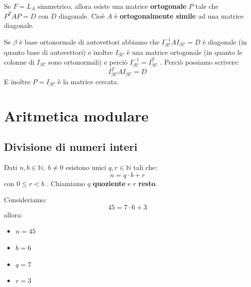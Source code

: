 \documentclass[
  a4paper,
]{article}
\providecommand{\tightlist}{%
  \setlength{\itemsep}{0pt}\setlength{\parskip}{0pt}}
\providecommand{\tightlist}{}
\begin{document}
\begin{propositionbox}[Corollario]
Se \(F = L_A\) simmetrico, allora esiste una matrice \textbf{ortogonale}
\(P\) tale che \(P^TAP =D\) con \(D\) diagonale. Cioè \(A\) è
\textbf{ortogonalmente simile} ad una matrice diagonale.
\end{propositionbox}

\begin{proofbox}
Se \(\beta\) è base ortonormale di autovettori abbiamo che
\(I^{-1}_{\beta \mathcal{C}}A I_{\beta \mathcal{C}} = D\) è diagonale
(in quanto base di autovettori) e inoltre \(I_{\beta \mathcal{C}}\) è
una matrice ortogonale (in quanto le colonne di
\(I_{\beta \mathcal{C}}\) sono ortonormali) e perciò
\(I_{\beta \mathcal{C}} ^{-1} = I_{\beta \mathcal{C}} ^T\) . Perciò
possiamo scrivere: \[
I^{T}_{\beta \mathcal{C}}A I_{\beta \mathcal{C}} = D
\] E inoltre \(P = I_{\beta \mathcal{C}}\) è la matrice cercata.
\end{proofbox}

\newpage

\hypertarget{aritmetica-modulare}{%
\section{Aritmetica modulare}\label{aritmetica-modulare}}

\hypertarget{divisione-di-numeri-interi}{%
\subsection{Divisione di numeri
interi}\label{divisione-di-numeri-interi}}

\begin{teoremabox}
Dati \(n, b \in \mathbb{N}, \; b \neq 0\) esistono unici
\(q, r \in \mathbb{N}\) tali che: \[
n = q\cdot b + r
\] con \(0 \leq r < b\) . Chiamiamo \(q\) \textbf{quoziente} e \(r\)
\textbf{resto}.
\end{teoremabox}

\begin{examplebox}
Consideriamo: \[
45 = 7 \cdot 6 + 3
\] allora:

\begin{itemize}
\tightlist
\item
  \(n = 45\)
\item
  \(b = 6\)
\item
  \(q = 7\)
\item
  \(r = 3\)
\end{itemize}
\end{examplebox}
\end{document}

